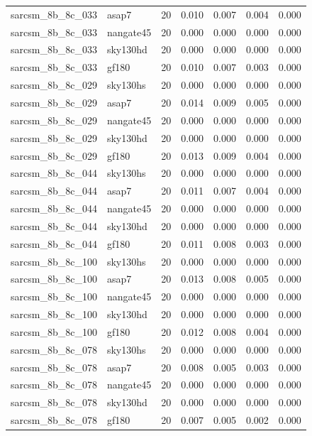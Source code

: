 \begin{tabular}{llrrrrr}
sarcsm\_8b\_8c\_033 & asap7 & 20 & 0.010 & 0.007 & 0.004 & 0.000 \\
sarcsm\_8b\_8c\_033 & nangate45 & 20 & 0.000 & 0.000 & 0.000 & 0.000 \\
sarcsm\_8b\_8c\_033 & sky130hd & 20 & 0.000 & 0.000 & 0.000 & 0.000 \\
sarcsm\_8b\_8c\_033 & gf180 & 20 & 0.010 & 0.007 & 0.003 & 0.000 \\
sarcsm\_8b\_8c\_029 & sky130hs & 20 & 0.000 & 0.000 & 0.000 & 0.000 \\
sarcsm\_8b\_8c\_029 & asap7 & 20 & 0.014 & 0.009 & 0.005 & 0.000 \\
sarcsm\_8b\_8c\_029 & nangate45 & 20 & 0.000 & 0.000 & 0.000 & 0.000 \\
sarcsm\_8b\_8c\_029 & sky130hd & 20 & 0.000 & 0.000 & 0.000 & 0.000 \\
sarcsm\_8b\_8c\_029 & gf180 & 20 & 0.013 & 0.009 & 0.004 & 0.000 \\
sarcsm\_8b\_8c\_044 & sky130hs & 20 & 0.000 & 0.000 & 0.000 & 0.000 \\
sarcsm\_8b\_8c\_044 & asap7 & 20 & 0.011 & 0.007 & 0.004 & 0.000 \\
sarcsm\_8b\_8c\_044 & nangate45 & 20 & 0.000 & 0.000 & 0.000 & 0.000 \\
sarcsm\_8b\_8c\_044 & sky130hd & 20 & 0.000 & 0.000 & 0.000 & 0.000 \\
sarcsm\_8b\_8c\_044 & gf180 & 20 & 0.011 & 0.008 & 0.003 & 0.000 \\
sarcsm\_8b\_8c\_100 & sky130hs & 20 & 0.000 & 0.000 & 0.000 & 0.000 \\
sarcsm\_8b\_8c\_100 & asap7 & 20 & 0.013 & 0.008 & 0.005 & 0.000 \\
sarcsm\_8b\_8c\_100 & nangate45 & 20 & 0.000 & 0.000 & 0.000 & 0.000 \\
sarcsm\_8b\_8c\_100 & sky130hd & 20 & 0.000 & 0.000 & 0.000 & 0.000 \\
sarcsm\_8b\_8c\_100 & gf180 & 20 & 0.012 & 0.008 & 0.004 & 0.000 \\
sarcsm\_8b\_8c\_078 & sky130hs & 20 & 0.000 & 0.000 & 0.000 & 0.000 \\
sarcsm\_8b\_8c\_078 & asap7 & 20 & 0.008 & 0.005 & 0.003 & 0.000 \\
sarcsm\_8b\_8c\_078 & nangate45 & 20 & 0.000 & 0.000 & 0.000 & 0.000 \\
sarcsm\_8b\_8c\_078 & sky130hd & 20 & 0.000 & 0.000 & 0.000 & 0.000 \\
sarcsm\_8b\_8c\_078 & gf180 & 20 & 0.007 & 0.005 & 0.002 & 0.000 \\

\end{tabular}
